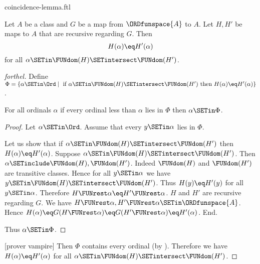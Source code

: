 \documentclass{naproche-library}
\begin{document}
\begin{smodule}[title=The Coincidence Lemma]{coincidence-lemma.ftl}
  
\begin{lemma}[forthel,title=Coincidence Lemma,id=transfinite-recursion_coincidence]
  Let $A$ be a class and $G$ be a map from $\ORDfunspace{A}$ to $A$.
  Let $H, H'$ be maps to $A$ that are recursive regarding $G$.
  Then \[ H(\alpha) \eq H'(\alpha) \] for all $\alpha \SETin \FUNdom(H) \SETintersect \FUNdom(H')$.
\end{lemma}
\begin{proof}[forthel]
  Define $\Phi = \{ \alpha \SETin \Ord \mid\text{ if }
  \alpha \SETin \FUNdom(H) \SETintersect \FUNdom(H')\text{ then }H(\alpha) \eq H'(\alpha) \}$.

  For all ordinals $\alpha$ if every ordinal less than $\alpha$ lies in $\Phi$ then $\alpha \SETin \Phi$.
  \begin{proof}
    Let $\alpha \SETin \Ord$.
    Assume that every $y \SETin \alpha$ lies in $\Phi$.

    Let us show that if $\alpha \SETin \FUNdom(H) \SETintersect \FUNdom(H')$ then
    $H(\alpha) \eq H'(\alpha)$.
      Suppose $\alpha \SETin \FUNdom(H) \SETintersect \FUNdom(H')$.
      Then $\alpha \SETinclude \FUNdom(H), \FUNdom(H')$.
      Indeed $\FUNdom(H)$ and $\FUNdom(H')$ are transitive classes.
      Hence for all $y \SETin \alpha$ we have $y \SETin \FUNdom(H) \SETintersect \FUNdom(H')$.
      Thus $H(y) \eq H'(y)$ for all $y \SETin \alpha$.
      Therefore $H \FUNrest \alpha \eq H' \FUNrest \alpha$.
      $H$ and $H'$ are recursive regarding $G$.
      We have $H \FUNrest \alpha, H' \FUNrest \alpha \SETin \ORDfunspace{A}$.
      Hence $H(\alpha)
        \eq G(H \FUNrest \alpha)
        \eq G(H' \FUNrest \alpha)
        \eq H'(\alpha)$.
    End.

    Thus $\alpha \SETin \Phi$.
  \end{proof}

  [prover vampire]
  Then $\Phi$ contains every ordinal (by ).
  Therefore we have $H(\alpha) \eq H'(\alpha)$ for all $\alpha \SETin \FUNdom(H) \SETintersect \FUNdom(H')$.
\end{proof}
\end{smodule}
\end{document}
